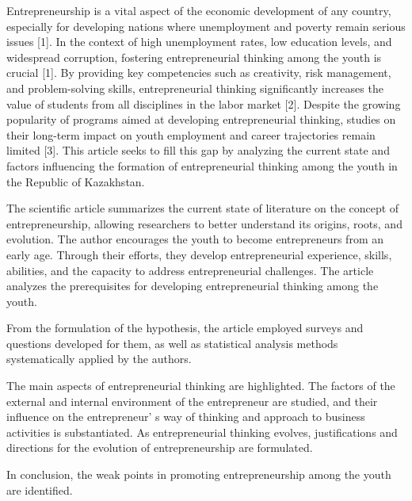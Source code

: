 Entrepreneurship is a vital aspect of the economic development of any
country, especially for developing nations where unemployment and
poverty remain serious issues {[}1{]}. In the context of high
unemployment rates, low education levels, and widespread corruption,
fostering entrepreneurial thinking among the youth is crucial {[}1{]}.
By providing key competencies such as creativity, risk management, and
problem-solving skills, entrepreneurial thinking significantly increases
the value of students from all disciplines in the labor market {[}2{]}.
Despite the growing popularity of programs aimed at developing
entrepreneurial thinking, studies on their long-term impact on youth
employment and career trajectories remain limited {[}3{]}. This article
seeks to fill this gap by analyzing the current state and factors
influencing the formation of entrepreneurial thinking among the youth in
the Republic of Kazakhstan.

The scientific article summarizes the current state of literature on the
concept of entrepreneurship, allowing researchers to better understand
its origins, roots, and evolution. The author encourages the youth to
become entrepreneurs from an early age. Through their efforts, they
develop entrepreneurial experience, skills, abilities, and the capacity
to address entrepreneurial challenges. The article analyzes the
prerequisites for developing entrepreneurial thinking among the youth.

From the formulation of the hypothesis, the article employed surveys and
questions developed for them, as well as statistical analysis methods
systematically applied by the authors.

The main aspects of entrepreneurial thinking are highlighted. The
factors of the external and internal environment of the entrepreneur are
studied, and their influence on the entrepreneur' s way
of thinking and approach to business activities is substantiated. As
entrepreneurial thinking evolves, justifications and directions for the
evolution of entrepreneurship are formulated.

In conclusion, the weak points in promoting entrepreneurship among the
youth are identified.

